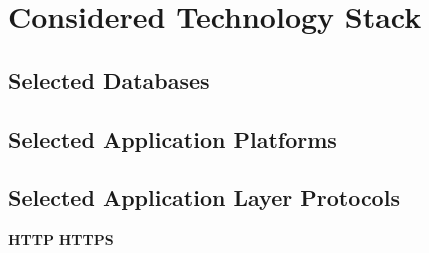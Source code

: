 

\section{Considered Technology Stack}


\subsection{Selected Databases}
\subsection{Selected Application Platforms}
\subsection{Selected Application Layer Protocols}

\textbf{HTTP}
\textbf{HTTPS}
